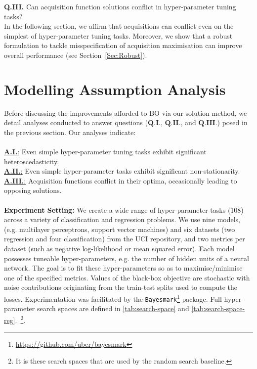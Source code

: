 \documentclass[jair,twoside,11pt,theapa]{article}
\theoremstyle{definition}
\begin{document}
\par{\textbf{Q.III.}} Can acquisition function solutions conflict in hyper-parameter tuning tasks? \\

\noindent In the following section, we affirm that acquisitions can conflict even on the simplest of hyper-parameter tuning tasks. Moreover, we show that a robust formulation to tackle misspecification of acquisition maximisation can improve overall performance (see Section~\ref{Sec:Robust}).
 


\section{Modelling Assumption Analysis}\label{Sec:Answers}
Before discussing the improvements afforded to BO via our solution method, we detail analyses conducted to answer questions ($\textbf{Q.I.}$, $\textbf{Q.II.}$, and $\textbf{Q.III.}$) posed in the previous section. Our analyses indicate: \\ \\
\underline{\textbf{A.I.}:} Even simple hyper-parameter tuning tasks exhibit significant heteroscedasticity.\\
\underline{\textbf{A.II.}:} Even simple  hyper-parameter tasks exhibit significant non-stationarity.\\
\underline{\textbf{A.III.}:} Acquisition functions conflict in their optima, occasionally leading to opposing solutions. \\ \\
\textbf{Experiment Setting:} We create a wide range of hyper-parameter tasks (108) across a variety of classification and regression problems. We use nine models, (e.g. multilayer perceptrons, support vector machines) and six datasets (two regression and four classification) from the UCI repository, and two metrics per dataset (such as negative log-likelihood or mean squared error). Each model possesses tuneable hyper-parameters, e.g. the number of hidden units of a neural network. The goal is to fit these hyper-parameters so as to maximise/minimise one of the specified metrics. Values of the black-box objective are stochastic with noise contributions originating from the train-test splits used to compute the losses. Experimentation was facilitated by the \texttt{Bayesmark}\footnote{\href{https://github.com/uber/bayesmark}{https://github.com/uber/bayesmark}} package. Full hyper-parameter search spaces are defined in \autoref{tab:search-space} and \autoref{tab:search-space-reg}.~\footnote{It is these search spaces that are used by the random search baseline.}. \\
\end{document}
